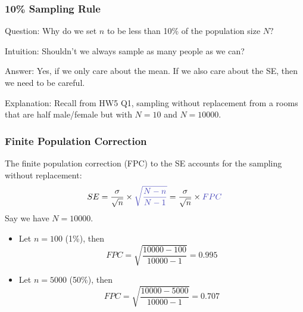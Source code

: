 \documentclass[handout]{beamer}
\newcommand{\blue}[1]{\textcolor{blue2}{#1}}
\begin{document}
\begin{frame}[fragile]
\frametitle{10\% Sampling Rule}

\blue{Question}: Why do we set $n$ to be less than 10\% of the population size $N?$

\pause\vspace{0.5cm}

\blue{Intuition}: Shouldn't we always sample as many people as we can?

\pause\vspace{0.5cm}

\blue{Answer}: Yes, if we only care about the mean.  If we also care about the SE, then we need to be careful.  

\pause\vspace{0.5cm}

\blue{Explanation}:  Recall from HW5 Q1, sampling without replacement from a rooms that are half male/female but with $N=10$ and $N=10000$.  

\end{frame}


\begin{frame}[fragile]
\frametitle{Finite Population Correction}

%
%
The \blue{finite population correction (FPC)} to the SE accounts for the \blue{sampling without replacement}:
\[
SE = \frac{\sigma}{\sqrt{n}} \times \blue{\sqrt{\frac{N-n}{N-1}}} =
\frac{\sigma}{\sqrt{n}} \times \blue{FPC}
\]
Say we have $N=10000$.  
\begin{itemize}
\pause\item Let $n=100$ (1\%), then
\[
FPC=\sqrt{\frac{10000-100}{10000-1}} = 0.995
\]
\pause\item Let $n=5000$ (50\%), then
\[
FPC=\sqrt{\frac{10000-5000}{10000-1}} = 0.707
\]
\end{itemize}

\end{frame}
\end{document}
